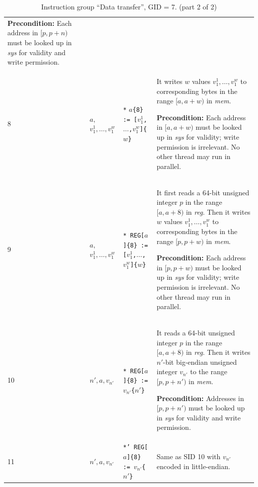 \documentclass[10pt,twocolumn]{article}
\begin{document}
\begin{table}[!h]
\begin{center}
\begin{tabular}{lp{1.2cm}p{5.5cm}p{7.5cm}}
\textbf{Precondition:} Each address in $ [p,p+n) $ must be looked up in
\textit{sys} for validity and write permission. \\

8 & $ a, $  $v_1^1,\ldots,v_1^w $ %
& \texttt{*} $ a $\texttt{\{8\} := [}$ v_1^1 $\texttt{,}$ \ldots $\texttt{,}$
v_1^w $\texttt{]\{}$ w $\texttt{\}} %
& It writes $ w $ values $ v_1^1,\ldots,v_1^w $ to corresponding bytes in the
range $ [a,a+w) $ in \textit{mem}.

\textbf{Precondition:} Each address in $ [a,a+w) $ must be looked up in \textit{sys}
for validity; write permission is irrelevant. No other thread may run in
parallel. \\

9 & $ a, $  $v_1^1,\ldots,v_1^w $ %
& \texttt{* REG[}$ a $\texttt{]\{8\} := [}$ v_1^1 $\texttt{,}$ \ldots
$\texttt{,}$ v_1^w $\texttt{]\{}$ w $\texttt{\}} %
& It first reads a 64-bit unsigned integer $ p $ in the range $ [a,a+8) $ in
\textit{reg}. Then it writes $ w $ values $ v_1^1,\ldots,v_1^w $ to
corresponding bytes in the range $ [p,p+w) $ in \textit{mem}.

\textbf{Precondition:} Each address in $ [p,p+w) $ must be looked up in
\textit{sys} for validity; write permission is irrelevant. No other thread may run in
parallel. \\

10 & $ n',a,v_{n'} $ %
& \texttt{* REG[}$ a $\texttt{]\{8\} := }$ v_{n'} $\texttt{\{}$ n' $\texttt{\}}
%
& It reads a 64-bit unsigned integer $ p $ in the range $ [a,a+8) $ in
\textit{reg}. Then it writes $ n' $-bit big-endian unsigned integer $ v_{n'} $
to the range $ [p,p+n') $ in \textit{mem}.

\textbf{Precondition:} Addresses in $ [p,p+n') $ must be looked up in
\textit{sys} for validity and write permission. \\

11 & $ n',a,v_{n'} $ %
& \texttt{*' REG[}$ a $\texttt{]\{8\} := }$ v_{n'} $\texttt{\{}$ n' $\texttt{\}}
%
& Same as SID 10 with $ v_{n'} $ encoded in little-endian. \\



\end{tabular}
\end{center}
\caption{Instruction group ``Data transfer'', GID = 7. (part 2 of 2)}
\label{tab:igroup:datatransfer_end}
\end{table}
\end{document}

